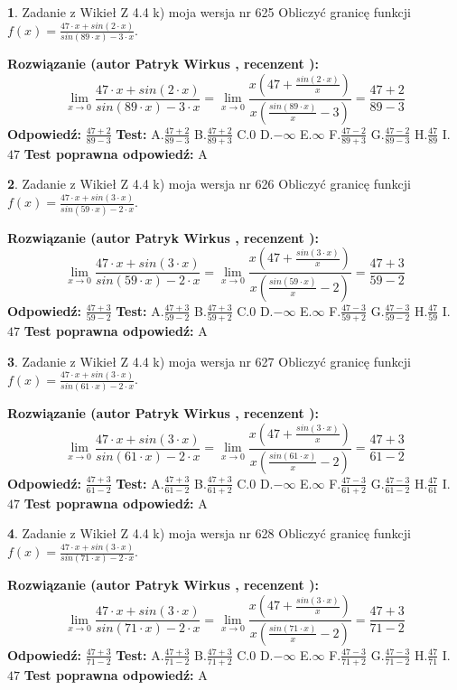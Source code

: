 \documentclass[12pt, a4paper]{article}
\theoremstyle{definition} %
\newtheorem{zad}{}
\newcommand{\zadStart}[1]{\begin{zad}#1\newline}
\newcommand{\zadStop}{\end{zad}}
\newcommand{\rozwStart}[2]{\noindent \textbf{Rozwiązanie (autor #1 , recenzent #2): }\newline}
\newcommand{\rozwStop}{\newline}
\newcommand{\odpStart}{\noindent \textbf{Odpowiedź:}\newline}
\newcommand{\odpStop}{\newline}
\newcommand{\testStart}{\noindent \textbf{Test:}\newline}
\newcommand{\testStop}{\newline}
\newcommand{\kluczStart}{\noindent \textbf{Test poprawna odpowiedź:}\newline}
\newcommand{\kluczStop}{\newline}
\begin{document}
\zadStart{Zadanie z Wikieł Z 4.4 k) moja wersja nr 625}
Obliczyć granicę funkcji $f(x)=\frac{47\cdot x +sin(2\cdot x)}{sin(89\cdot x) -3\cdot x}$.
\zadStop
\rozwStart{Patryk Wirkus}{}
$$\lim\limits_{x\to 0}\frac{47\cdot x +sin(2\cdot x)}{sin(89\cdot x) -3\cdot x}
=\lim\limits_{x\to 0}\frac{x(47+\frac{sin(2\cdot x)}{x})}{x(\frac{sin(89\cdot x)}{x}-3)}
=\frac{47+2}{89-3}$$
\rozwStop
\odpStart
$\frac{47+2}{89-3}$
\odpStop
\testStart
A.$\frac{47+2}{89-3}$
B.$\frac{47+2}{89+3}$
C.$0$
D.$-\infty$
E.$\infty$
F.$\frac{47-2}{89+3}$
G.$\frac{47-2}{89-3}$
H.$\frac{47}{89}$
I.$47$
\testStop
\kluczStart
A
\kluczStop



\zadStart{Zadanie z Wikieł Z 4.4 k) moja wersja nr 626}
Obliczyć granicę funkcji $f(x)=\frac{47\cdot x +sin(3\cdot x)}{sin(59\cdot x) -2\cdot x}$.
\zadStop
\rozwStart{Patryk Wirkus}{}
$$\lim\limits_{x\to 0}\frac{47\cdot x +sin(3\cdot x)}{sin(59\cdot x) -2\cdot x}
=\lim\limits_{x\to 0}\frac{x(47+\frac{sin(3\cdot x)}{x})}{x(\frac{sin(59\cdot x)}{x}-2)}
=\frac{47+3}{59-2}$$
\rozwStop
\odpStart
$\frac{47+3}{59-2}$
\odpStop
\testStart
A.$\frac{47+3}{59-2}$
B.$\frac{47+3}{59+2}$
C.$0$
D.$-\infty$
E.$\infty$
F.$\frac{47-3}{59+2}$
G.$\frac{47-3}{59-2}$
H.$\frac{47}{59}$
I.$47$
\testStop
\kluczStart
A
\kluczStop



\zadStart{Zadanie z Wikieł Z 4.4 k) moja wersja nr 627}
Obliczyć granicę funkcji $f(x)=\frac{47\cdot x +sin(3\cdot x)}{sin(61\cdot x) -2\cdot x}$.
\zadStop
\rozwStart{Patryk Wirkus}{}
$$\lim\limits_{x\to 0}\frac{47\cdot x +sin(3\cdot x)}{sin(61\cdot x) -2\cdot x}
=\lim\limits_{x\to 0}\frac{x(47+\frac{sin(3\cdot x)}{x})}{x(\frac{sin(61\cdot x)}{x}-2)}
=\frac{47+3}{61-2}$$
\rozwStop
\odpStart
$\frac{47+3}{61-2}$
\odpStop
\testStart
A.$\frac{47+3}{61-2}$
B.$\frac{47+3}{61+2}$
C.$0$
D.$-\infty$
E.$\infty$
F.$\frac{47-3}{61+2}$
G.$\frac{47-3}{61-2}$
H.$\frac{47}{61}$
I.$47$
\testStop
\kluczStart
A
\kluczStop



\zadStart{Zadanie z Wikieł Z 4.4 k) moja wersja nr 628}
Obliczyć granicę funkcji $f(x)=\frac{47\cdot x +sin(3\cdot x)}{sin(71\cdot x) -2\cdot x}$.
\zadStop
\rozwStart{Patryk Wirkus}{}
$$\lim\limits_{x\to 0}\frac{47\cdot x +sin(3\cdot x)}{sin(71\cdot x) -2\cdot x}
=\lim\limits_{x\to 0}\frac{x(47+\frac{sin(3\cdot x)}{x})}{x(\frac{sin(71\cdot x)}{x}-2)}
=\frac{47+3}{71-2}$$
\rozwStop
\odpStart
$\frac{47+3}{71-2}$
\odpStop
\testStart
A.$\frac{47+3}{71-2}$
B.$\frac{47+3}{71+2}$
C.$0$
D.$-\infty$
E.$\infty$
F.$\frac{47-3}{71+2}$
G.$\frac{47-3}{71-2}$
H.$\frac{47}{71}$
I.$47$
\testStop
\kluczStart
A
\kluczStop
\end{document}
